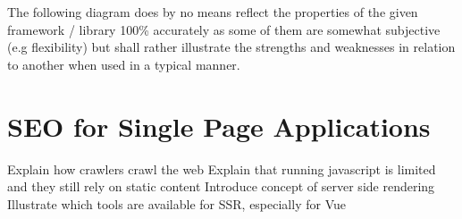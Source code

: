 The following diagram does by no means reflect the properties of the given framework / library 100\% accurately as some of them are somewhat subjective (e.g flexibility) but shall rather illustrate the strengths and weaknesses in relation to another when used in a typical manner.

\newcommand\ColorBox[1]{\textcolor{#1}{\rule{2ex}{2ex}}}



\section{SEO for Single Page Applications}

Explain how crawlers crawl the web
Explain that running javascript is limited and they still rely on static content
Introduce concept of server side rendering
Illustrate which tools are available for SSR, especially for Vue